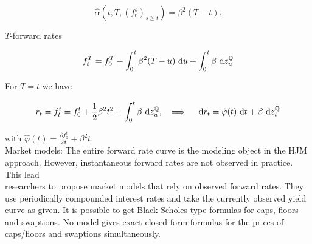 $$
\hat{\alpha}\left(t, T,\left(f_{t}^{s}\right)_{s \geq t}\right)=\beta^{2}(T-t) .
$$

$T$-forward rates

$$
f_{t}^{T}=f_{0}^{T}+\int_{0}^{t} \beta^{2}(T-u) \text{ d}  u+\int_{0}^{t} \beta \text{ d}  z_{u}^{\mathbb{Q}}
$$

For $T=t$ we have

$$
r_{t}=f_{t}^{t}=f_{0}^{t}+\frac{1}{2} \beta^{2} t^{2}+\int_{0}^{t} \beta \text{ d}  z_{u}^{\mathbb{Q}}, \quad \Longrightarrow \quad \text{ d}  r_{t}=\hat{\varphi}(t) \text{ d}  t+\beta \text{ d}  z_{t}^{\mathbb{Q}}
$$

with $\hat{\varphi}(t)=\frac{\partial f_{0}^{t}}{\partial t}+\beta^{2} t$.\\
Market models: The entire forward rate curve is the modeling object in the HJM approach. However, instantaneous forward rates are not observed in practice. This lead\\
researchers to propose market models that rely on observed forward rates. They use periodically compounded interest rates and take the currently observed yield curve as given. It is possible to get Black-Scholes type formulas for caps, floors and swaptions. No model gives exact closed-form formulas for the prices of caps/floors and swaptions simultaneously.

